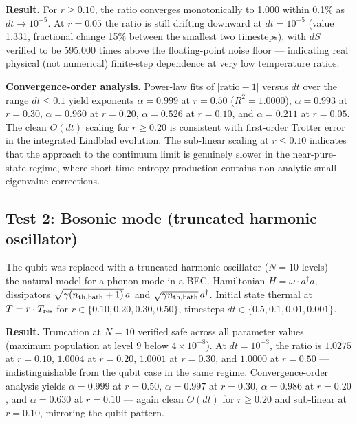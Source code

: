 \documentclass[11pt]{article}
\begin{document}
\textbf{Result.} For \(r \geq 0.10\), the ratio converges monotonically to 1.000 within 0.1\% as \(dt \to 10^{-5}\). At \(r = 0.05\) the ratio is still drifting downward at \(dt = 10^{-5}\) (value 1.331, fractional change 15\% between the smallest two timesteps), with \(dS\) verified to be 595,000 times above the floating-point noise floor --- indicating real physical (not numerical) finite-step dependence at very low temperature ratios.

\textbf{Convergence-order analysis.} Power-law fits of \(|\text{ratio} - 1|\) versus \(dt\) over the range \(dt \leq 0.1\) yield exponents \(\alpha = 0.999\) at \(r = 0.50\) (\(R^2 = 1.0000\)), \(\alpha = 0.993\) at \(r = 0.30\), \(\alpha = 0.960\) at \(r = 0.20\), \(\alpha = 0.526\) at \(r = 0.10\), and \(\alpha = 0.211\) at \(r = 0.05\). The clean \(O(dt)\) scaling for \(r \geq 0.20\) is consistent with first-order Trotter error in the integrated Lindblad evolution. The sub-linear scaling at \(r \leq 0.10\) indicates that the approach to the continuum limit is genuinely slower in the near-pure-state regime, where short-time entropy production contains non-analytic small-eigenvalue corrections.

\subsection{Test 2: Bosonic mode (truncated harmonic oscillator)}\label{test-2-bosonic-mode-truncated-harmonic-oscillator}

The qubit was replaced with a truncated harmonic oscillator (\(N = 10\) levels) --- the natural model for a phonon mode in a BEC. Hamiltonian \(H = \omega \cdot a^\dagger a\), dissipators \(\sqrt{\gamma(n_{\rm th,bath}+1)}\,a\) and \(\sqrt{\gamma n_{\rm th,bath}}\,a^\dagger\). Initial state thermal at \(T = r \cdot T_{\rm res}\) for \(r \in \{0.10, 0.20, 0.30, 0.50\}\), timesteps \(dt \in \{0.5, 0.1, 0.01, 0.001\}\).

\textbf{Result.} Truncation at \(N = 10\) verified safe across all parameter values (maximum population at level 9 below \(4 \times 10^{-8}\)). At \(dt = 10^{-3}\), the ratio is \(1.0275\) at \(r = 0.10\), \(1.0004\) at \(r = 0.20\), \(1.0001\) at \(r = 0.30\), and \(1.0000\) at \(r = 0.50\) --- indistinguishable from the qubit case in the same regime. Convergence-order analysis yields \(\alpha = 0.999\) at \(r = 0.50\), \(\alpha = 0.997\) at \(r = 0.30\), \(\alpha = 0.986\) at \(r = 0.20\), and \(\alpha = 0.630\) at \(r = 0.10\) --- again clean \(O(dt)\) for \(r \geq 0.20\) and sub-linear at \(r = 0.10\), mirroring the qubit pattern.
\end{document}
